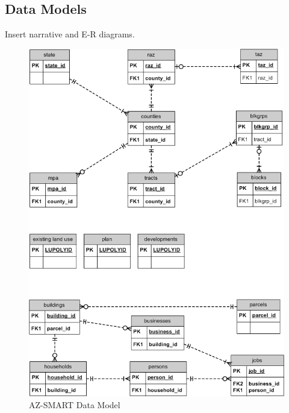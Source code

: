 \subsection{Data Models}
Insert narrative and E-R diagrams.



\begin{figure}[h]
\begin{center}
\includegraphics[scale=0.5]{figures/AZ-SMART_data_model_diagram.png}
\caption{AZ-SMART Data Model}
\end{center}
\end{figure}